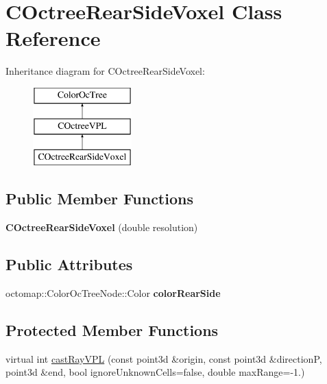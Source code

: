 \hypertarget{classCOctreeRearSideVoxel}{}\section{C\+Octree\+Rear\+Side\+Voxel Class Reference}
\label{classCOctreeRearSideVoxel}
Inheritance diagram for C\+Octree\+Rear\+Side\+Voxel\+:\begin{figure}[H]
\begin{center}
\leavevmode
\includegraphics[height=3.000000cm]{classCOctreeRearSideVoxel}
\end{center}
\end{figure}
\subsection*{Public Member Functions}
\begin{DoxyCompactItemize}
\item 
{\bfseries C\+Octree\+Rear\+Side\+Voxel} (double resolution)\hypertarget{classCOctreeRearSideVoxel_a748a65035c7992eede6202ee632fdcc1}{}\label{classCOctreeRearSideVoxel_a748a65035c7992eede6202ee632fdcc1}

\end{DoxyCompactItemize}
\subsection*{Public Attributes}
\begin{DoxyCompactItemize}
\item 
octomap\+::\+Color\+Oc\+Tree\+Node\+::\+Color {\bfseries color\+Rear\+Side}\hypertarget{classCOctreeRearSideVoxel_a123be33074b8e80e0ee2305b6c543cbf}{}\label{classCOctreeRearSideVoxel_a123be33074b8e80e0ee2305b6c543cbf}

\end{DoxyCompactItemize}
\subsection*{Protected Member Functions}
\begin{DoxyCompactItemize}
\item 
virtual int \hyperlink{classCOctreeRearSideVoxel_a46ea49d079922e12ea62aff9ec8cae98}{cast\+Ray\+V\+PL} (const point3d \&origin, const point3d \&directionP, point3d \&end, bool ignore\+Unknown\+Cells=false, double max\+Range=-\/1.)
\end{DoxyCompactItemize}
